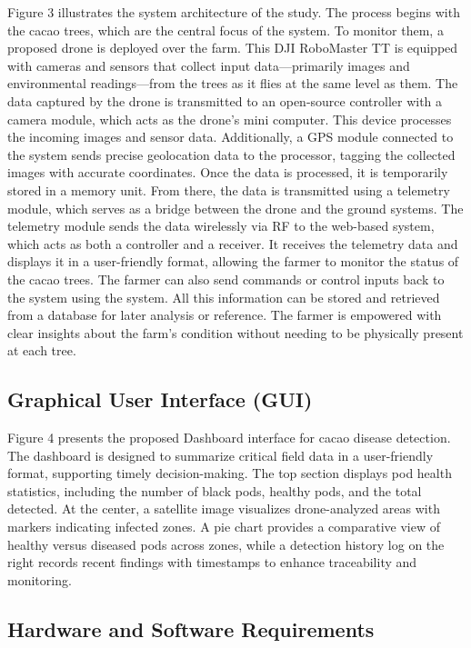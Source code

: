 Figure 3 illustrates the system architecture of the study. The process begins with the cacao trees, which are the central focus of the system. To monitor them, a proposed drone is deployed over the farm. This DJI RoboMaster TT is equipped with cameras and sensors that collect input data—primarily images and environmental readings—from the trees as it flies at the same level as them. The data captured by the drone is transmitted to an open-source controller with a camera module, which acts as the drone’s mini computer. This device processes the incoming images and sensor data. Additionally, a GPS module connected to the system sends precise geolocation data to the processor, tagging the collected images with accurate coordinates. Once the data is processed, it is temporarily stored in a memory unit. From there, the data is transmitted using a telemetry module, which serves as a bridge between the drone and the ground systems. The telemetry module sends the data wirelessly via RF to the web-based system, which acts as both a controller and a receiver. It receives the telemetry data and displays it in a user-friendly format, allowing the farmer to monitor the status of the cacao trees. The farmer can also send commands or control inputs back to the system using the system. All this information can be stored and retrieved from a database for later analysis or reference. The farmer is empowered with clear insights about the farm’s condition without needing to be physically present at each tree.

\subsection{Graphical User Interface (GUI)}
Figure 4 presents the proposed Dashboard interface for cacao disease detection. The dashboard is designed to summarize critical field data in a user-friendly format, supporting timely decision-making. The top section displays pod health statistics, including the number of black pods, healthy pods, and the total detected. At the center, a satellite image visualizes drone-analyzed areas with markers indicating infected zones. A pie chart provides a comparative view of healthy versus diseased pods across zones, while a detection history log on the right records recent findings with timestamps to enhance traceability and monitoring.

\subsection{Hardware and Software Requirements}

